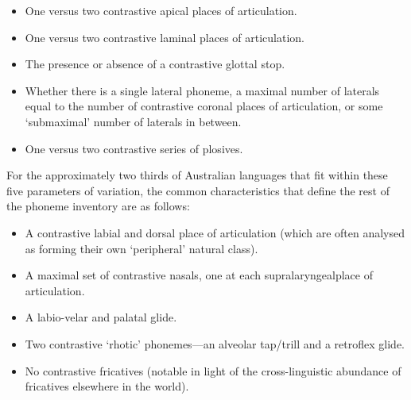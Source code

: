 \begin{itemize}
\tightlist
\item
  One versus two contrastive apical places of articulation.
\item
  One versus two contrastive laminal places of articulation.
\item
  The presence or absence of a contrastive glottal stop.
\item
  Whether there is a single lateral phoneme, a maximal number of laterals equal to the number of contrastive coronal places of articulation, or some `submaximal' number of laterals in between.
\item
  One versus two contrastive series of plosives.
\end{itemize}

For the approximately two thirds of Australian languages that fit within these five parameters of variation, the common characteristics that define the rest of the phoneme inventory are as follows:

\begin{itemize}
\tightlist
\item
  A contrastive labial and dorsal place of articulation (which are often analysed as forming their own `peripheral' natural class).
\item
  A maximal set of contrastive nasals, one at each supralaryngealplace of articulation.
\item
  A labio-velar and palatal glide.
\item
  Two contrastive `rhotic' phonemes---an alveolar tap/trill and a retroflex glide.
\item
  No contrastive fricatives (notable in light of the cross-linguistic abundance of fricatives elsewhere in the world).
\end{itemize}

